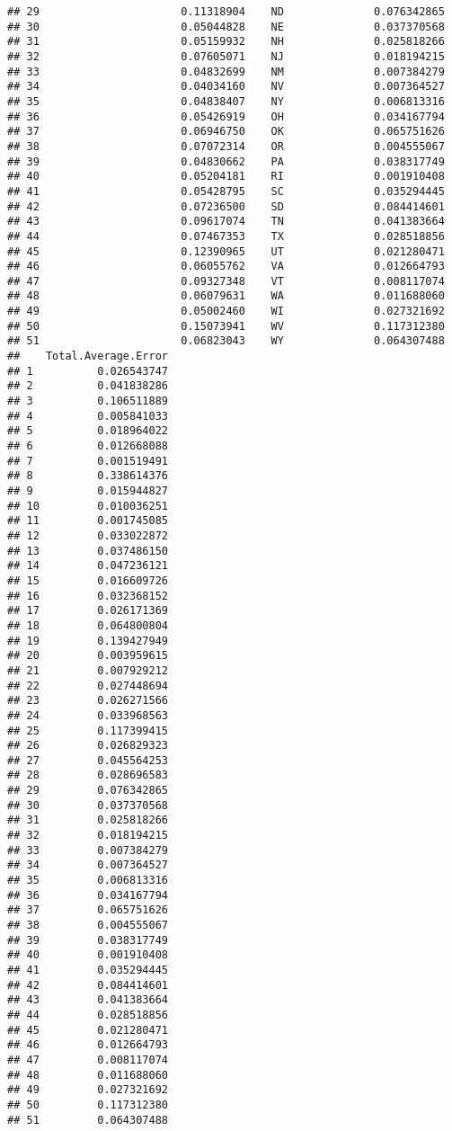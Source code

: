 \documentclass{article}\usepackage[]{graphicx}\usepackage[]{color}
\makeatletter
\newenvironment{kframe}{%
 \def\at@end@of@kframe{}%
 \ifinner\ifhmode%
  \def\at@end@of@kframe{\end{minipage}}%
  \begin{minipage}{\columnwidth}%
 \fi\fi%
 \def\FrameCommand##1{\hskip\@totalleftmargin \hskip-\fboxsep
 \colorbox{shadecolor}{##1}\hskip-\fboxsep
     \hskip-\linewidth \hskip-\@totalleftmargin \hskip\columnwidth}%
 \MakeFramed {\advance\hsize-\width
   \@totalleftmargin\z@ \linewidth\hsize
   \@setminipage}}%
 {\par\unskip\endMakeFramed%
 \at@end@of@kframe}
\newenvironment{knitrout}{}{} %
\makeatother
\begin{document}
\begin{knitrout}
\begin{kframe}
\begin{verbatim}
## 29                      0.11318904    ND              0.076342865
## 30                      0.05044828    NE              0.037370568
## 31                      0.05159932    NH              0.025818266
## 32                      0.07605071    NJ              0.018194215
## 33                      0.04832699    NM              0.007384279
## 34                      0.04034160    NV              0.007364527
## 35                      0.04838407    NY              0.006813316
## 36                      0.05426919    OH              0.034167794
## 37                      0.06946750    OK              0.065751626
## 38                      0.07072314    OR              0.004555067
## 39                      0.04830662    PA              0.038317749
## 40                      0.05204181    RI              0.001910408
## 41                      0.05428795    SC              0.035294445
## 42                      0.07236500    SD              0.084414601
## 43                      0.09617074    TN              0.041383664
## 44                      0.07467353    TX              0.028518856
## 45                      0.12390965    UT              0.021280471
## 46                      0.06055762    VA              0.012664793
## 47                      0.09327348    VT              0.008117074
## 48                      0.06079631    WA              0.011688060
## 49                      0.05002460    WI              0.027321692
## 50                      0.15073941    WV              0.117312380
## 51                      0.06823043    WY              0.064307488
##    Total.Average.Error
## 1          0.026543747
## 2          0.041838286
## 3          0.106511889
## 4          0.005841033
## 5          0.018964022
## 6          0.012668088
## 7          0.001519491
## 8          0.338614376
## 9          0.015944827
## 10         0.010036251
## 11         0.001745085
## 12         0.033022872
## 13         0.037486150
## 14         0.047236121
## 15         0.016609726
## 16         0.032368152
## 17         0.026171369
## 18         0.064800804
## 19         0.139427949
## 20         0.003959615
## 21         0.007929212
## 22         0.027448694
## 23         0.026271566
## 24         0.033968563
## 25         0.117399415
## 26         0.026829323
## 27         0.045564253
## 28         0.028696583
## 29         0.076342865
## 30         0.037370568
## 31         0.025818266
## 32         0.018194215
## 33         0.007384279
## 34         0.007364527
## 35         0.006813316
## 36         0.034167794
## 37         0.065751626
## 38         0.004555067
## 39         0.038317749
## 40         0.001910408
## 41         0.035294445
## 42         0.084414601
## 43         0.041383664
## 44         0.028518856
## 45         0.021280471
## 46         0.012664793
## 47         0.008117074
## 48         0.011688060
## 49         0.027321692
## 50         0.117312380
## 51         0.064307488
\end{verbatim}
\end{kframe}
\end{knitrout}
\end{document}
